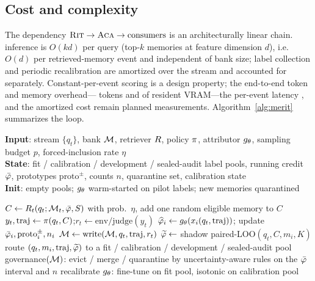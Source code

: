 \subsection{Cost and complexity}
The dependency $\textsc{Rit}{} \rightarrow \textsc{Aca}{} \rightarrow \text{consumers}$ is an
architecturally linear chain. \aca{} inference is $O(kd)$ per query (top-$k$
memories at feature dimension $d$), i.e. $O(d)$ per retrieved-memory event and
independent of bank size; \rit{} label collection and periodic recalibration are
amortized over the stream and accounted for separately. Constant-per-event scoring
is a design property; the end-to-end token and memory overhead---%
 tokens and  of resident
VRAM---the per-event latency , and the amortized \rit{}
cost  remain planned measurements.
Algorithm~\ref{alg:merit} summarizes the loop.

\begin{algorithm}[t]
\caption{\method{} main loop}
\label{alg:merit}
\textbf{Input}: stream $\{q_t\}$, bank $\mathcal{M}$, retriever $R$, policy
$\pi$, attributor $g_{\theta}$, sampling budget $p$, forced-inclusion rate $\eta$\\
\textbf{State}: fit / calibration / development / sealed-audit label pools, running
credit $\bar{\varphi}$, prototypes $\text{proto}^{\pm}$, counts $n$, quarantine set,
calibration state\\
\textbf{Init}: empty pools; $g_{\theta}$ warm-started on pilot labels; new memories
quarantined
\begin{algorithmic}[1]
  \STATE $C \gets R_t(q_t;\mathcal{M}_t,\bar{\varphi},S)$ 
  \STATE with prob.\ $\eta$, add one random eligible memory to $C$ 
  \STATE $y_t, \text{traj} \gets \pi(q_t, C)$;\quad $r_t \gets \text{env/judge}(y_t)$
    \STATE $\widehat{\varphi}_i \gets g_{\theta}(x_i(q_t, \text{traj}))$; update $\bar{\varphi}_i, \text{proto}^{\pm}_i, n_i$
  \ENDFOR
  \STATE $\mathcal{M} \gets \text{write}(\mathcal{M}, q_t, \text{traj}, r_t)$ 
      \STATE $\widetilde{\varphi} \gets$ shadow paired-LOO$(q_t, C, m_i, K)$ 
      \STATE route $(q_t, m_i, \text{traj}, \widetilde{\varphi})$ to a fit / calibration / development / sealed-audit pool
    \ENDFOR
  \ENDIF
  \STATE governance$(\mathcal{M})$: evict / merge / quarantine by uncertainty-aware rules on the $\bar{\varphi}$ interval and $n$
    \STATE recalibrate $g_{\theta}$: fine-tune on fit pool, isotonic on calibration pool
  \ENDIF
\ENDFOR
\end{algorithmic}
\end{algorithm}
